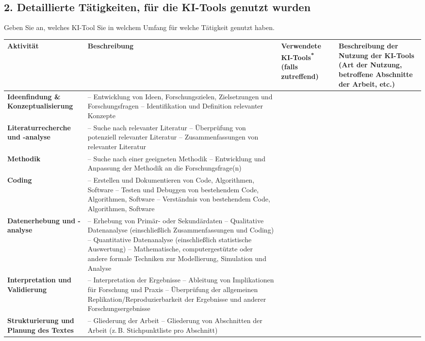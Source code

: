 \subsection*{2. Detaillierte Tätigkeiten, für die KI-Tools genutzt wurden}
Geben Sie an, welches KI-Tool Sie in welchem Umfang für welche Tätigkeit genutzt haben.
\begingroup
\small

\begin{tabularx}{\textwidth}{|L|L|L|L|}
\hline
\textbf{Aktivität} &
\textbf{Beschreibung} &
\textbf{Verwendete KI-Tools}\textsuperscript{*} \newline \scriptsize (falls zutreffend) &
\textbf{Beschreibung der Nutzung der KI-Tools} \newline \scriptsize (Art der Nutzung, betroffene Abschnitte der Arbeit, etc.) \\
\hline
\endhead
\hline
\endfoot
\textbf{Ideenfindung \& Konzeptualisierung} &
– Entwicklung von Ideen, Forschungszielen, Zielsetzungen und Forschungsfragen \newline
– Identifikation und Definition relevanter Konzepte &
&
\\
\hline
\textbf{Literaturrecherche und -analyse} &
– Suche nach relevanter Literatur \newline
– Überprüfung von potenziell relevanter Literatur \newline
– Zusammenfassungen von relevanter Literatur &
&
\\
\hline
\textbf{Methodik} &
– Suche nach einer geeigneten Methodik \newline
– Entwicklung und Anpassung der Methodik an die Forschungsfrage(n) &
&
\\
\hline
\textbf{Coding} &
– Erstellen und Dokumentieren von Code, Algorithmen, Software \newline
– Testen und Debuggen von bestehendem Code, Algorithmen, Software \newline
– Verständnis von bestehendem Code, Algorithmen, Software &
&
\\
\hline
\textbf{Datenerhebung und -analyse} &
– Erhebung von Primär- oder Sekundärdaten \newline
– Qualitative Datenanalyse (einschließlich Zusammenfassungen und Coding) \newline
– Quantitative Datenanalyse (einschließlich statistische Auswertung) \newline
– Mathematische, computergestützte oder andere formale Techniken zur Modellierung, Simulation und Analyse &
&
\\
\hline
\textbf{Interpretation und Validierung} &
– Interpretation der Ergebnisse \newline
– Ableitung von Implikationen für Forschung und Praxis \newline
– Überprüfung der allgemeinen Replikation/Reproduzierbarkeit der Ergebnisse und anderer Forschungsergebnisse &
&
\\
\hline
\textbf{Strukturierung und Planung des Textes} &
– Gliederung der Arbeit \newline
– Gliederung von Abschnitten der Arbeit (z.\,B. Stichpunktliste pro Abschnitt) &
&
\\
\hline


\end{tabularx}

